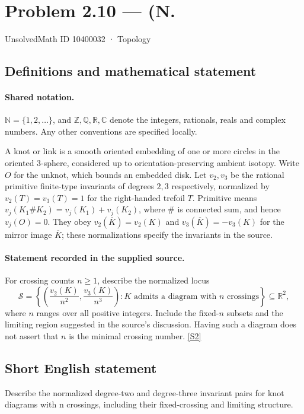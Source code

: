 \documentclass[11pt]{article}
\newcommand{\sref}[2]{\hyperlink{source:#1:#2}{[S#2]}}
\begin{document}
\setcounter{section}{10400031}
\section{Problem 2.10 — (N.}\label{10400032}
{\small\sffamily UnsolvedMath ID 10400032 · Topology}
\subsection{Definitions and mathematical statement}

\paragraph{Shared notation.}$\mathbb N=\{1,2,\ldots\}$, and $\mathbb Z,\mathbb Q,\mathbb R,\mathbb C$ denote the integers, rationals, reals and complex numbers. Any other conventions are specified locally.


A knot or link is a smooth oriented embedding of one or more circles in the oriented $3$-sphere, considered up to orientation-preserving ambient isotopy. Write $O$ for the unknot, which bounds an embedded disk. Let $v_2,v_3$ be the rational primitive finite-type invariants of degrees $2,3$ respectively, normalized by $v_2(T)=v_3(T)=1$ for the right-handed trefoil $T$. Primitive means $v_j(K_1\#K_2)=v_j(K_1)+v_j(K_2)$, where $\#$ is connected sum, and hence $v_j(O)=0$. They obey $v_2(\overline K)=v_2(K)$ and $v_3(\overline K)=-v_3(K)$ for the mirror image $\overline K$; these normalizations specify the invariants in the source.
\paragraph{Statement recorded in the supplied source.}
For crossing counts $n\ge1$, describe the normalized locus
\[\mathcal S=\left\{\left(\frac{v_2(K)}{n^2},\frac{v_3(K)}{n^3}\right):K\text{ admits a diagram with }n\text{ crossings}\right\}\subseteq\mathbb R^2,\]
where $n$ ranges over all positive integers. Include the fixed-$n$ subsets and the limiting region suggested in the source's discussion. Having such a diagram does not assert that $n$ is the minimal crossing number. \sref{10400032}{2}
\subsection{Short English statement}
Describe the normalized degree-two and degree-three invariant pairs for knot diagrams with n crossings, including their fixed-crossing and limiting structure.
\end{document}
